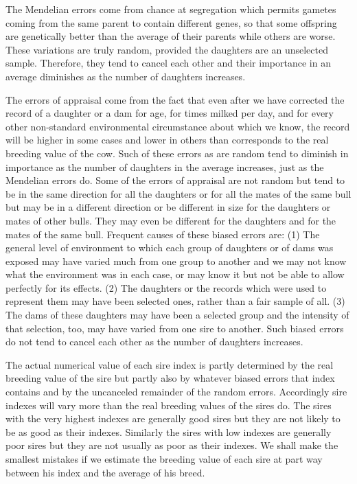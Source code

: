 The Mendelian errors come from chance at segregation which permits
gametes coming from the same parent to contain different genes,
so that some offspring are genetically better than the average of their
parents while others are worse. These variations are truly random, provided
the daughters are an unselected sample. Therefore, they tend to
cancel each other and their importance in an average diminishes as the
number of daughters increases.

The errors of appraisal come from the fact that even after we have
corrected the record of a daughter or a dam for age, for times milked
per day, and for every other non-standard environmental circumstance
about which we know, the record will be higher in some cases and lower
in others than corresponds to the real breeding value of the cow. Such
of these errors as are random tend to diminish in importance as the
number of daughters in the average increases, just as the Mendelian
errors do. Some of the errors of appraisal are not random but tend to be
in the same direction for all the daughters or for all the mates of the
same bull but may be in a different direction or be different in size for
the daughters or mates of other bulls. They may even be different for
the daughters and for the mates of the same bull. Frequent causes of
these biased errors are: (1) The general level of environment to which
each group of daughters or of dams was exposed may have varied much
from one group to another and we may not know what the environment
was in each case, or may know it but not be able to allow perfectly for
its effects. (2) The daughters or the records which were used to represent
them may have been selected ones, rather than a fair sample of all.
(3) The dams of these daughters may have been a selected group and
the intensity of that selection, too, may have varied from one sire to
another. Such biased errors do not tend to cancel each other as the
number of daughters increases.

The actual numerical value of each sire index is partly determined
by the real breeding value of the sire but partly also by whatever biased
errors that index contains and by the uncanceled remainder of the random
errors. Accordingly sire indexes will vary more than the real breeding
values of the sires do. The sires with the very highest indexes are
generally good sires but they are not likely to be as good as their
indexes. Similarly the sires with low indexes are generally poor sires
but they are not usually as poor as their indexes. We shall make the
smallest mistakes if we estimate the breeding value of each sire at part
way between his index and the average of his breed.

